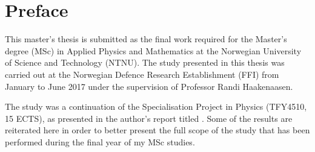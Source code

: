 \cleardoublepage  %
\chapter*{Preface}%
%
This master's thesis is submitted as the final work required for the Master's degree (MSc) in Applied Physics and Mathematics at the Norwegian University of Science and Technology (NTNU). The study presented in this thesis was carried out at the Norwegian Defence Research Establishment (FFI) from January to June 2017 under the supervision of Professor Randi Haakenaasen. 

The study was a continuation of the Specialisation Project in Physics (TFY4510, 15 ECTS), as presented in the author's report titled  \citep{lauten2017characterisation}. Some of the results are reiterated here in order to better present the full scope of the study that has been performed during the final year of my MSc studies. %

